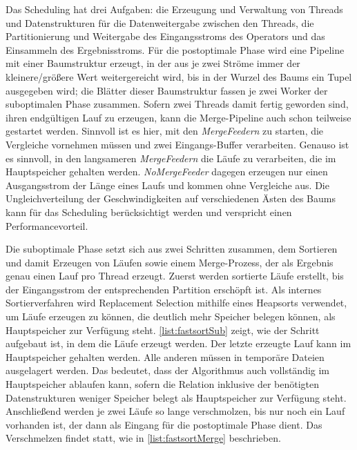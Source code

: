 \documentclass[a4paper,12pt,twoside]{article}
\newcommand{\Fb}[1]{\textit{#1}} %
\begin{document}
{Das Scheduling hat drei Aufgaben: die Erzeugung und Verwaltung von Threads und Datenstrukturen für die Datenweitergabe zwischen den Threads, die Partitionierung und Weitergabe des Eingangsstroms des Operators und das Einsammeln des Ergebnisstroms. Für die postoptimale Phase wird eine Pipeline mit einer Baumstruktur erzeugt, in der aus je zwei Ströme immer der kleinere/größere Wert weitergereicht wird, bis in der Wurzel des Baums ein Tupel ausgegeben wird; die Blätter dieser Baumstruktur fassen je zwei Worker der suboptimalen Phase zusammen. Sofern zwei Threads damit fertig geworden sind, ihren endgültigen Lauf zu erzeugen, kann die Merge-Pipeline auch schon teilweise gestartet werden. Sinnvoll ist es hier, mit den \Fb{MergeFeedern} zu starten, die Vergleiche vornehmen müssen und zwei Eingangs-Buffer verarbeiten. Genauso ist es sinnvoll, in den langsameren \Fb{MergeFeedern} die Läufe zu verarbeiten, die im Hauptspeicher gehalten werden. \Fb{NoMergeFeeder} dagegen erzeugen nur einen Ausgangsstrom der Länge eines Laufs und kommen ohne Vergleiche aus. Die Ungleichverteilung der Geschwindigkeiten auf verschiedenen Ästen des Baums kann für das Scheduling berücksichtigt werden und verspricht einen Performancevorteil.

Die suboptimale Phase setzt sich aus zwei Schritten zusammen, dem Sortieren und damit Erzeugen von Läufen sowie einem Merge-Prozess, der als Ergebnis genau einen Lauf pro Thread erzeugt. Zuerst werden sortierte Läufe erstellt, bis der Eingangsstrom der entsprechenden Partition erschöpft ist. Als internes Sortierverfahren wird Replacement Selection mithilfe eines Heapsorts verwendet, um Läufe erzeugen zu können, die deutlich mehr Speicher belegen können, als Hauptspeicher zur Verfügung steht. \autoref{list:fastsortSub} zeigt, wie der Schritt aufgebaut ist, in dem die Läufe erzeugt werden. Der letzte erzeugte Lauf kann im Hauptspeicher gehalten werden. Alle anderen müssen in temporäre Dateien ausgelagert werden. Das bedeutet, dass der Algorithmus auch vollständig im Hauptspeicher ablaufen kann, sofern die Relation inklusive der benötigten Datenstrukturen weniger Speicher belegt als Hauptspeicher zur Verfügung steht. Anschließend werden je zwei Läufe so lange verschmolzen, bis nur noch ein Lauf vorhanden ist, der dann als Eingang für die postoptimale Phase dient. Das Verschmelzen findet statt, wie in  \autoref{list:fastsortMerge} beschrieben.

}
\end{document}
